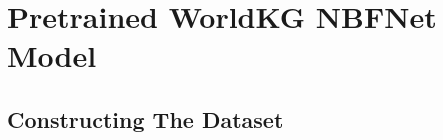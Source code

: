 \chapter{Pretrained WorldKG NBFNet Model}\label{ch:worldkg}


\section{Constructing The Dataset}\label{sec:constructing-dataset}

